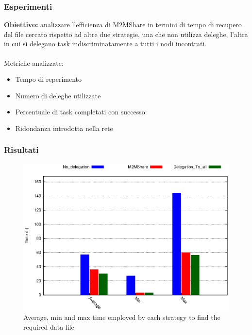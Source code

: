 \documentclass{beamer}
\begin{document}
\begin{frame}
\label{Esperimenti}
\frametitle{Esperimenti}
\textbf{Obiettivo:} analizzare l'efficienza di M2MShare in termini di tempo di recupero del file cercato rispetto ad altre due strategie, una che non utilizza deleghe, l'altra in cui si delegano task indiscriminatamente a tutti i nodi incontrati.\\
\ \\
Metriche analizzate:
\begin{itemize}
\item Tempo di reperimento
\item Numero di deleghe utilizzate
\item Percentuale di task completati con successo
\item Ridondanza introdotta nella rete
\end{itemize}
\end{frame}

\begin{frame}
\frametitle{Risultati}
\begin{center}
\begin{figure}[ht]
\includegraphics[scale=0.7]{tempi.eps}
\caption{Average, min and max time employed by each strategy to find the required data file}
\end{figure}
\end{center}
\end{frame}
\end{document}
